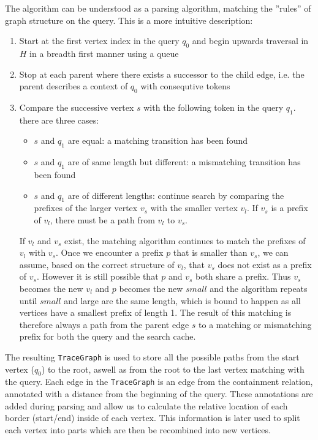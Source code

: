 %

The algorithm can be understood as a parsing algorithm, matching the ''rules'' of graph structure on the query. This is a more intuitive description:
\begin{enumerate}
    \item Start at the first vertex index in the query $q_0$ and begin upwards traversal in $H$ in a breadth first manner using a queue
    \item Stop at each parent where there exists a successor to the child edge, i.e. the parent describes a context of $q_0$ with consequtive tokens
    \item Compare the successive vertex $s$ with the following token in the query $q_1$. there are three cases:
    \begin{itemize}
        \item $s$ and $q_1$ are equal: a matching transition has been found
        \item $s$ and $q_1$ are of same length but different: a mismatching transition has been found
        \item $s$ and $q_1$ are of different lengths: continue search by comparing the prefixes of the larger vertex $v_s$ with the smaller vertex $v_l$. If $v_s$ is a prefix of $v_l$, there must be a path from $v_l$ to $v_s$.  
    \end{itemize}
    If $v_l$ and $v_s$ exist, the matching algorithm continues to match the prefixes of $v_l$ with $v_s$.
    Once we encounter a prefix $p$ that is smaller than $v_s$, we can assume, based on the correct structure of $v_l$, that $v_s$ does not exist as a prefix of $v_s$. However it is still possible that $p$ and $v_s$ both share a prefix. Thus $v_s$ becomes the new $v_l$ and $p$ becomes the new $small$ and the algorithm repeats until $small$ and large are the same length, which is bound to happen as all vertices have a smallest prefix of length 1.
    The result of this matching is therefore always a path from the parent edge $s$ to a matching or mismatching prefix for both the query and the search cache.
\end{enumerate}

The resulting \texttt{TraceGraph} is used to store all the possible paths from the start vertex ($q_0$) to the root, aswell as from the root to the last vertex matching with the query. Each edge in the \texttt{TraceGraph} is an edge from the containment relation, annotated with a distance from the beginning of the query. These annotations are added during parsing and allow us to calculate the relative location of each border (start/end) inside of each vertex. This information is later used to split each vertex into parts which are then be recombined into new vertices.
